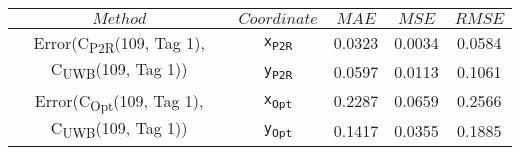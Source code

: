 \begin{table}[h]
\centering
\begin{tabular}{|c|c|c|c|c|}
\hline
$Method$ & $Coordinate$ & $MAE$ & $MSE$ & $RMSE$ \\
\hline
\multirow{2}{*}{{\footnotesize Error(C\textsubscript{P2R}(109, Tag 1), C\textsubscript{UWB}(109, Tag 1))}} & \texttt{x\textsubscript{P2R}} & 0.0323 & 0.0034 & 0.0584 \\
& \texttt{y\textsubscript{P2R}} & 0.0597 & 0.0113 & 0.1061 \\
\hline
\multirow{2}{*}{{\footnotesize Error(C\textsubscript{Opt}(109, Tag 1), C\textsubscript{UWB}(109, Tag 1))}} & \texttt{x\textsubscript{Opt}} & 0.2287 & 0.0659 & 0.2566 \\
& \texttt{y\textsubscript{Opt}} & 0.1417 & 0.0355 & 0.1885 \\
\hline
\end{tabular}
\end{table}
